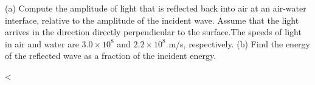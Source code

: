 (a) Compute the amplitude of light that is reflected back into
air at an air-water interface, relative to the amplitude of
the incident wave. Assume that the light arrives in the direction
directly perpendicular to the surface.The speeds of light in air and water are
$3.0\times10^8$ and $2.2\times10^8$ m/s, respectively.\hwendpart
(b) Find the energy of the reflected wave as a fraction of
the incident energy.

<%
\answercheck


